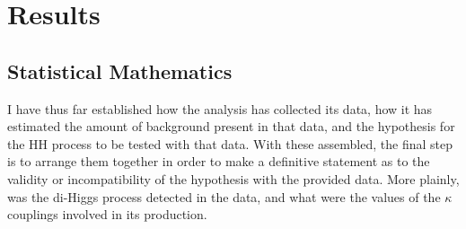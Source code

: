 \chapter{Results} \label{chapter:results}

%
%
%
%
%
%
%
%        
%
%

\section{Statistical Mathematics}

    I have thus far established how the analysis has collected its data,
        how it has estimated the amount of background present in that data,
        and the hypothesis for the HH process to be tested with that data.
    With these assembled, the final step is to arrange them together in order to make a definitive statement
        as to the validity or incompatibility of the hypothesis with the provided data.
    More plainly, was the di-Higgs process detected in the data,
        and what were the values of the $\kappa$ couplings involved in its production.

